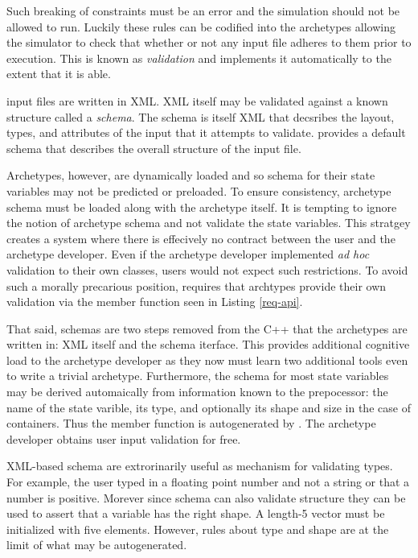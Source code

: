 Such breaking of constraints must be an error and the simulation should not be 
allowed to run. Luckily these rules can be codified into the archetypes allowing 
the simulator to check that whether or not any input file adheres to them prior
to execution. This is known as \emph{validation} and \cyclus implements it 
automatically to the extent that it is able. 

\Cyclus input files are written in XML. XML itself may be validated against a 
known structure called a \emph{schema}. The schema is itself XML that decsribes 
the layout, types, and attributes of the input that it attempts to validate.
\Cyclus provides a default schema that describes the overall structure of the 
input file.

Archetypes, however, are dynamically loaded and so schema for their state 
variables may not be predicted or preloaded. To ensure consistency, archetype schema 
must be loaded along with the archetype itself.  It is tempting to ignore the 
notion of archetype schema and not validate the state variables.
This stratgey creates a system where there is effecively no contract between the 
user and the archetype developer. Even if the archetype developer implemented 
\emph{ad hoc} validation to their own classes, users would not expect such 
restrictions.  To avoid such a morally precarious position, \cyclus requires
that archtypes provide their own validation via the  member 
function seen in Listing \ref{req-api}.

That said, schemas are two steps removed from the C++ that the archetypes
are written in: XML itself and the schema iterface. This provides additional 
cognitive load to the archetype developer as they now must learn two additional
tools even to write a trivial archetype. Furthermore, the schema for most state
variables may be derived automaically from information known to the prepocessor:
the name of the state varible, its type, and optionally its shape and size in 
the case of containers. Thus the  member function is autogenerated
by \cycpp. The archetype developer obtains user input validation for free.

XML-based schema are extrorinarily useful as mechanism for validating types. 
For example, the user typed in a floating point number and not a string or that 
a number is positive.
Morever since schema can also validate structure they can be used to assert that 
a variable has the right shape. A length-5 vector must be initialized with 
five elements. However, rules about type and shape are at the limit of what may 
be autogenerated.

